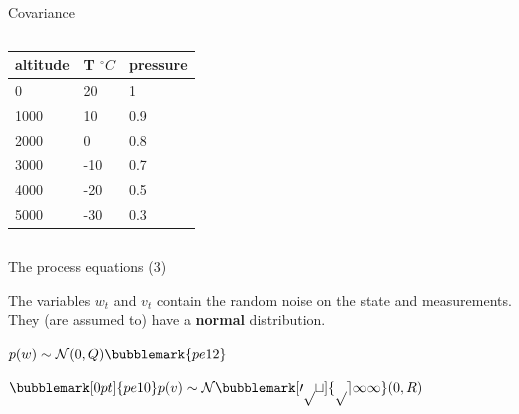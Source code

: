 \documentclass[compress]{beamer}
\begin{document}
\begin{frame}{Covariance}
{    \begin{columns}
        \begin{column}{0.4\linewidth}
            \begin{tabular}{@{}lll@{}}
                \toprule
                altitude & T $^{\circ}C$ & pressure \\ \midrule
                0        & 20          & 1            \\
                1000     & 10          & 0.9          \\
                2000     & 0           & 0.8          \\
                3000     & -10         & 0.7          \\
                4000     & -20         & 0.5          \\
                5000     & -30         & 0.3          \\ \bottomrule
            \end{tabular}

        \end{column}
        \begin{column}{0.6\linewidth}

        \end{column}
    \end{columns}
}
\end{frame}

\begin{frame}{The process equations (3)}

    The variables $w_t$ and $v_t$ contain the random noise on the state and
    measurements. They (are assumed to) have a \textbf{normal} distribution.

    \vspace{3em}

    \Huge\centering
    $p(w) \sim \mathcal{N}(0, Q)\bubblemark{pe12}$

    $\bubblemark[0pt]{pe10}p(v) \sim \mathcal{N\bubblemark[0pt]{pe11}}(0, R)$




\end{frame}
\end{document}
